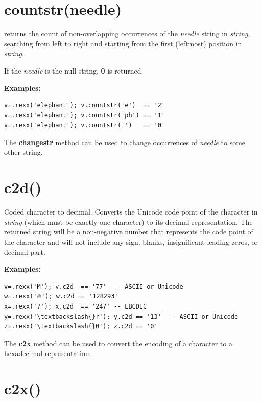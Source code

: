 \section{countstr(needle)}\label{refcoustr}
returns the count of non-overlapping occurrences of the
\emph{needle} string in \emph{string}, searching from left to
right and starting from the first (leftmost) position in
\emph{string}.
 
If the \emph{needle} is the null string, \textbf{0} is returned.
 
\textbf{Examples:}
\begin{lstlisting}
v=.rexx('elephant'); v.countstr('e')  == '2'
v=.rexx('elephant'); v.countstr('ph') == '1'
v=.rexx('elephant'); v.countstr('')   == '0'
\end{lstlisting}
 The  \textbf{changestr} method %
 can be used to
change occurrences of \emph{needle} to some other string.
\section{c2d()}\label{refc2d}

Coded character to decimal.
Converts the Unicode code point of the character in \emph{string} (which must
be exactly one character) to its decimal representation.
The returned string will be a non-negative number that represents
the code point of the character and will not include any sign, blanks,
insignificant leading zeros, or decimal part.
 
\textbf{Examples:}
\begin{lstlisting}
v=.rexx('M'); v.c2d  == '77'  -- ASCII or Unicode
w=.rexx('🔥'); w.c2d == '128293'
x=.rexx('7'); x.c2d  == '247' -- EBCDIC
y=.rexx('\textbackslash{}r'); y.c2d == '13'  -- ASCII or Unicode
z=.rexx('\textbackslash{}0'); z.c2d == '0'
\end{lstlisting}
 The  \textbf{c2x} method %
 can be used to
convert the encoding of a character to a hexadecimal representation.
\section{c2x()}\label{refc2x}

